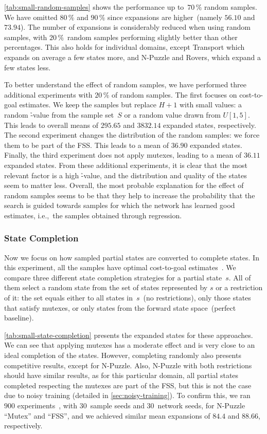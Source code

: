 \cref{tab:small-random-samples} shows the performance up to~$70\,\%$ random samples. We have omitted $80\,\%$ and $90\,\%$ since expansions are higher~(namely $56.10$ and $73.94$). The number of expansions is considerably reduced when using random samples, with $20\,\%$~random samples performing slightly better than other percentages. This also holds for individual domains, except Transport which expands on average a few states more, and N-Puzzle and Rovers, which expand a few states less.

To better understand the effect of random samples, we have performed three additional experiments with $20\,\%$ of random samples. The first focuses on cost-to-goal estimates. We keep the samples but replace $H+1$ with small values: a random \h-value from the sample set~$S$ or a random value drawn from $U[1,5]$. This leads to overall means of $295.65$ and $3832.14$ expanded states, respectively. The second experiment changes the distribution of the random samples: we force them to be part of the FSS. This leads to a mean of $36.90$ expanded states. Finally, the third experiment does not apply mutexes, leading to a mean of $36.11$ expanded states. From these additional experiments, it is clear that the most relevant factor is a high \h-value, and the distribution and quality of the states seem to matter less. Overall, the most probable explanation for the effect of random samples seems to be that they help to increase the probability that the search is guided towards samples for which the network has learned good estimates, i.e.,~the samples obtained through regression.

\subsubsection{State Completion}
\label{sec:small-exps-state-completion}

Now we focus on how sampled partial states are converted to complete states. In this experiment, all the samples have optimal cost-to-goal estimates~\hstar. We compare three different state completion strategies for a partial state~$s$. All of them select a random state from the set of states represented by $s$ or a restriction of it: the set equals either to all states in~$s$~(no restrictions), only those states that satisfy mutexes, or only states from the forward state space~(perfect baseline).

\cref{tab:small-state-completion} presents the expanded states for these approaches. We can see that applying mutexes has a moderate effect and is very close to an ideal completion of the states. However, completing randomly also presents competitive results, except for N-Puzzle. Also, N-Puzzle with both restrictions should have similar results, as for this particular domain, all partial states completed respecting the mutexes are part of the FSS, but this is not the case due to noisy training (detailed in \cref{sec:noisy-training}). To confirm this, we ran $900$ experiments~, with $30$~sample seeds and $30$~network seeds, for N-Puzzle ``Mutex'' and ``FSS'', and we achieved similar mean expansions of $84.4$ and $88.66$, respectively.

